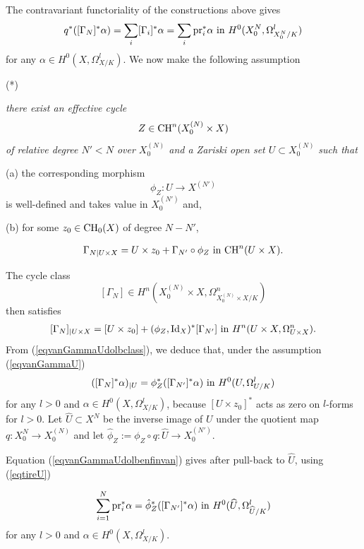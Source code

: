 \documentclass[10pt]{article}
\begin{document}
The contravariant functoriality of the constructions above
gives
\begin{eqnarray}\label{eqtireU}
q^*([\Gamma_N]^*\alpha)=\sum_i[\Gamma_i]^*\alpha=\sum_i{\rm pr}_i^*\alpha \,\,{\rm in}\,\,H^0(X^{N}_0,\Omega_{X^{N}_0/K}^l)
\end{eqnarray}
for any
$\alpha\in H^0(X,\Omega_{X/K}^l)$.
We  now make the following assumption

\vspace{0.5cm}

 (*) {\it there exist  an effective cycle
$$Z\in {\rm CH}^n(X^{(N)}_0\times X)$$ of relative degree $N'<N$ over $X^{(N)}_0$
and a
Zariski open set $U\subset  X^{(N)}_0$
such that

(a)  the corresponding morphism
$$\phi_Z:U\rightarrow X^{(N')}$$
is well-defined and takes value in $X^{(N')}_0$ and,

(b)  for some $z_0\in {\rm CH}_0(X)$ of degree $N-N'$,}
\begin{eqnarray}\label{eqvanGammaU} \Gamma_{N\mid U\times X}= U\times z_0+\Gamma_{N'}\circ \phi_{Z}\,\,{\rm in}\,\,{\rm CH}^n(U\times X).\end{eqnarray}

\vspace{0.5cm}

The  cycle class
$$[\Gamma_N]\in H^n(X^{(N)}_0\times X,\Omega_{X^{(N)}_0\times X/K}^n)$$
then satisfies
\begin{eqnarray}\label{eqvanGammaUdolbclass} [\Gamma_{N}]_{\mid U\times X}=[U\times z_0]+(\phi_Z,{\rm Id}_X)^*[\Gamma_{N'}]\,\,{\rm in}\,\,H^n(U\times X,\Omega_{U\times X}^n).\end{eqnarray}
From (\ref{eqvanGammaUdolbclass}), we deduce that, under the assumption (\ref{eqvanGammaU})
\begin{eqnarray}\label{eqvanGammaUdolbenfinvan} ([\Gamma_{N}]^*\alpha)_{\mid U}=\phi_Z^*([\Gamma_{N'}]^*\alpha)\,\,{\rm in}\,\,H^0(U,\Omega_{U/K}^l)\end{eqnarray}
for any $l>0$ and $\alpha\in  H^0(X,\Omega_{X/K}^{l})$, because $[U\times z_0]^*$ acts as zero on $l$-forms for $l>0$.
Let $\widehat{U}\subset X^N$ be the inverse image of $U$ under the quotient map $q:X^N_0\rightarrow X^{(N)}_0$ and let $\hat{\phi}_Z:=\phi_Z\circ q:\widehat{U}\rightarrow X^{(N')}_0$.

Equation (\ref{eqvanGammaUdolbenfinvan}) gives after pull-back to $\widehat{U}$, using (\ref{eqtireU})

\begin{eqnarray}\label{eqvcontrad} \sum_{i=1}^N{\rm pr}_i^*\alpha=\hat{\phi}_Z^*([\Gamma_{N'}]^*\alpha) \,\,{\rm in}\,\,H^0(\widehat{U},\Omega_{\widehat{U}/K}^l)\end{eqnarray}
for any $l>0$ and $\alpha\in  H^0(X,\Omega_{X/K}^{l})$.
\end{document}
